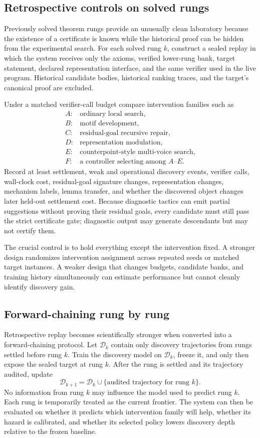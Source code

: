 \subsection{Retrospective controls on solved rungs}
Previously solved theorem rungs provide an unusually clean laboratory because the existence of a certificate is known while the historical proof can be hidden from the experimental search. For each solved rung $k$, construct a sealed replay in which the system receives only the axioms, verified lower-rung bank, target statement, declared representation interface, and the same verifier used in the live program. Historical candidate bodies, historical ranking traces, and the target's canonical proof are excluded.

Under a matched verifier-call budget compare intervention families such as
\[
\begin{array}{ll}
A:&\text{ordinary local search},\\
B:&\text{motif development},\\
C:&\text{residual-goal recursive repair},\\
D:&\text{representation modulation},\\
E:&\text{counterpoint-style multi-voice search},\\
F:&\text{a controller selecting among }A\text{--}E.
\end{array}
\]
Record at least settlement, weak and operational discovery events, verifier calls, wall-clock cost, residual-goal signature changes, representation changes, mechanism labels, lemma transfer, and whether the discovered object changes later held-out settlement cost. Because diagnostic tactics can emit partial suggestions without proving their residual goals, every candidate must still pass the strict certificate gate; diagnostic output may generate descendants but may not certify them.

The crucial control is to hold everything except the intervention fixed. A stronger design randomizes intervention assignment across repeated seeds or matched target instances. A weaker design that changes budgets, candidate banks, and training history simultaneously can estimate performance but cannot cleanly identify discovery gain.

\subsection{Forward-chaining rung by rung}
Retrospective replay becomes scientifically stronger when converted into a forward-chaining protocol. Let $\mathcal D_k$ contain only discovery trajectories from rungs settled before rung $k$. Train the discovery model on $\mathcal D_k$, freeze it, and only then expose the sealed target at rung $k$. After the rung is settled and its trajectory audited, update
\[
\mathcal D_{k+1}=\mathcal D_k\cup\{\text{audited trajectory for rung }k\}.
\]
No information from rung $k$ may influence the model used to predict rung $k$. Each rung is temporarily treated as the current frontier. The system can then be evaluated on whether it predicts which intervention family will help, whether its hazard is calibrated, and whether its selected policy lowers discovery depth relative to the frozen baseline.

